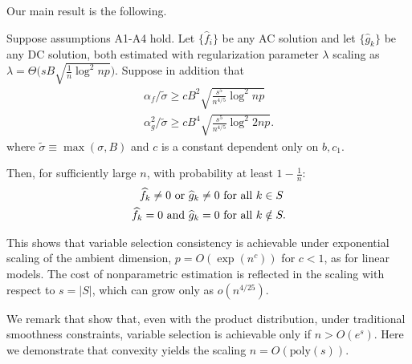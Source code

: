 Our main result is the following.
\begin{stheorem}
Suppose assumptions A1-A4 hold. Let $\{\hat{f}_i\}$ be any AC solution and
let $\{\hat{g}_k\}$ be any DC solution, both estimated with 
regularization parameter $\lambda$ scaling as
$\lambda = \Theta \Big( sB \sqrt{\frac{1}{n} \log^2 np} \Big)$. 
Suppose in addition that
\begin{gather}
\alpha_f/\tilde{\sigma} \geq c B^2 \sqrt{\frac{s^5}{n^{4/5}} \log^2
  np}\\
\alpha_g^2/\tilde{\sigma} \geq c B^4 \sqrt{\frac{s^5}{n^{4/5}}
  \log^2 2np}.
\end{gather} 
where $\tilde{\sigma} \equiv \max(\sigma, B)$ and $c$ is a constant dependent only on $b, c_1$.

Then, for sufficiently large $n$, with probability at least $1-\frac{1}{n}$:
\begin{align*}
\widehat{f}_k \neq 0 \textrm{ or } \widehat{g}_k \neq 0 &\textrm{ for all } k \in S\\
\widehat{f}_k = 0 \textrm{ and } \widehat{g}_k = 0 & \textrm{ for all } k \notin S.
\end{align*}

\end{stheorem}

This shows that variable selection consistency is achievable under
exponential scaling of the ambient dimension, $p = O(\exp(n^c))$
for $c<1$, as for linear models. The cost of nonparametric estimation is
reflected in the scaling with respect to $s=|S|$, which can grow only
as $o(n^{4/25})$.

We remark that \citet{dalalyan:12} show that, even with the product distribution,
 under traditional smoothness
constraints, variable selection is achievable only if $n > O(e^s)$. 
Here we demonstrate that convexity yields the scaling $n =
O(\textrm{poly}(s))$.



